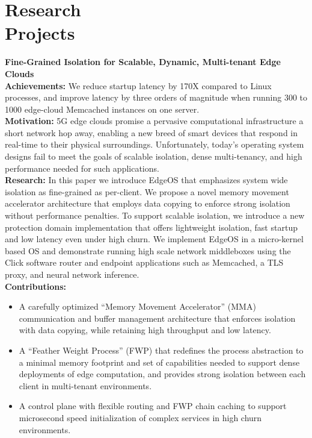 \section{Research\\Projects}
\textbf{Fine-Grained Isolation for Scalable, Dynamic, Multi-tenant Edge Clouds}
\\
\textbf{\small Achievements:}
We reduce startup latency by 170X compared to Linux processes, and improve latency by three orders of magnitude when running 300 to 1000 edge-cloud Memcached instances on one server.
\\
\textbf{\small Motivation:}
5G edge clouds promise a pervasive computational infrastructure a short network hop away, enabling a new breed of smart devices that respond in real-time to their physical surroundings.
Unfortunately, today’s operating system designs fail to meet the goals of scalable isolation, dense multi-tenancy, and high performance needed for such applications.
\\
\textbf{\small Research:}
In this paper we introduce EdgeOS that emphasizes system wide isolation as fine-grained as per-client.
We propose a novel memory movement accelerator architecture that employs data copying to enforce strong isolation without performance penalties.
To support scalable isolation, we introduce a new protection domain implementation that offers lightweight isolation, fast startup and low latency even under high churn.
We implement EdgeOS in a micro-kernel based OS and demonstrate running high scale network middleboxes using the Click software router and endpoint applications such as Memcached, a TLS proxy, and neural network inference.
\\
\textbf{\small Contributions:}
\begin{itemize}[leftmargin=*]
  \setlength\itemsep{-0.0em}
        \item A carefully optimized “Memory Movement Accelerator” (MMA) communication and buffer management architecture that enforces isolation with data copying, while retaining high throughput and low latency.
        \item A “Feather Weight Process” (FWP) that redefines the process abstraction to a minimal memory footprint and set of capabilities needed to support dense deployments of edge computation, and provides strong isolation between each client in multi-tenant environments.
        \item A control plane with flexible routing and FWP chain caching to support microsecond speed initialization of complex services in high churn environments.
\end{itemize}
